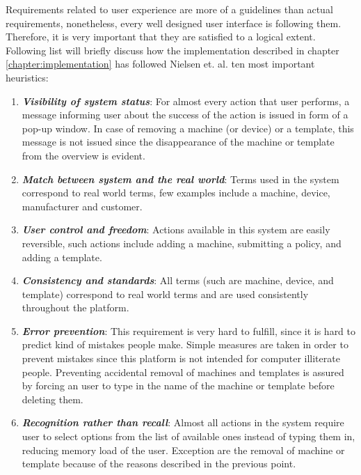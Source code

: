 Requirements related to user experience are more of a guidelines than actual requirements, nonetheless, every well designed user interface is following them. Therefore, it is very important that they are satisfied to a logical extent. Following list will briefly discuss how the implementation described in chapter \ref{chapter:implementation} has followed Nielsen et. al. \cite{nielsen199510,Nielsen:1994:EEP:191666.191729} ten most important heuristics:

\begin{enumerate}
	\setlength{\itemsep}{1pt}
	\item \textbf{\textit{Visibility of system status}}: For almost every action that user performs, a message informing user about the success of the action is issued in form of a pop-up window. In case of removing a machine (or device) or a template, this message is not issued since the disappearance of the machine or template from the overview is evident.

	\item \textbf{\textit{Match between system and the real world}}: Terms used in the system correspond to real world terms, few examples include a machine, device, manufacturer and customer. 

	\item \textbf{\textit{User control and freedom}}: Actions available in this system are easily reversible, such actions include adding a machine, submitting a policy, and adding a template.

	\item \textbf{\textit{Consistency and standards}}: All terms (such are machine, device, and template) correspond to real world terms and are used consistently throughout the platform.  

	\item \textbf{\textit{Error prevention}}: This requirement is very hard to fulfill, since it is hard to predict kind of mistakes people make. Simple measures are taken in order to prevent mistakes since this platform is not intended for computer illiterate people. Preventing accidental removal of machines and templates is assured by forcing an user to type in the name of the machine or template before deleting them.

	\item \textbf{\textit{Recognition rather than recall}}: Almost all actions in the system require user to select options from the list of available ones instead of typing them in, reducing memory load of the user. Exception are the removal of machine or template because of the reasons described in the previous point.


\end{enumerate}
